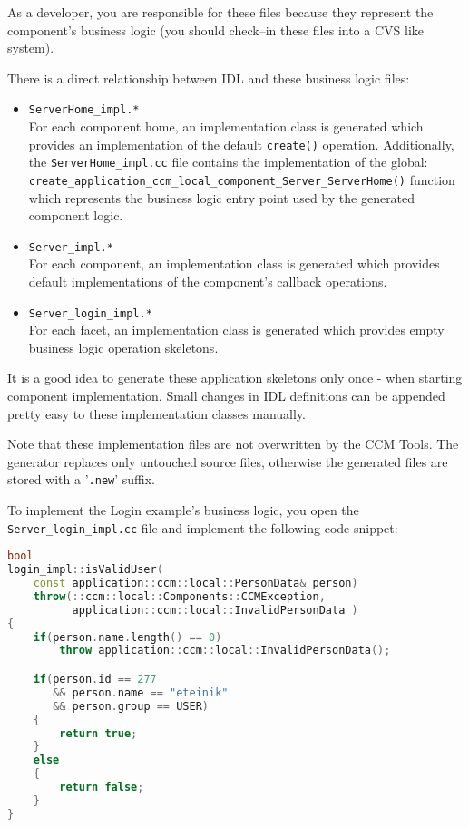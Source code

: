 As a developer, you are responsible for these files because they represent the
component's business logic (you should check--in these files into a CVS like system).

\vspace{3mm}
There is a direct relationship between IDL and these business logic files:
\begin{itemize}
	\item {\tt ServerHome\_impl.*}\\
	For each component home, an implementation class is generated which provides an
	implementation of the default {\tt create()} operation.
	Additionally, the {\tt ServerHome\_impl.cc} file contains the implementation of
	the global: \\
    {\tt create\_application\_ccm\_local\_component\_Server\_ServerHome()} 
 	function which represents the business logic entry point used by the generated 
 	component logic. 

\item {\tt Server\_impl.*}\\
	For each component, an implementation class is generated which provides 
	default implementations of the component's callback operations.
	
\item {\tt Server\_login\_impl.*}\\
	For each facet, an implementation class is generated which provides empty
	business logic operation skeletons.
\end{itemize}

It is a good idea to generate these application skeletons only once - when starting 
component implementation. 
Small changes in IDL definitions can be appended pretty easy to these
implementation classes manually.

 \vspace{3mm}
Note that these implementation files are not overwritten by the CCM Tools.
The generator replaces only untouched source files, otherwise the
generated files are stored with a '{\tt .new}' suffix.

 \vspace{3mm}
To implement the Login example's business logic, you open the 
{\tt Server\_login\_impl.cc} file and implement the following code snippet:

\begin{footnotesize}
\begin{lstlisting}[language=C++]
bool
login_impl::isValidUser(
    const application::ccm::local::PersonData& person)
    throw(::ccm::local::Components::CCMException,
          application::ccm::local::InvalidPersonData )
{
    if(person.name.length() == 0)
        throw application::ccm::local::InvalidPersonData();

    if(person.id == 277 
       && person.name == "eteinik"
       && person.group == USER) 
    {
        return true;
    }
    else 
    {
        return false;
    }
}
\end{lstlisting}
\end{footnotesize}

